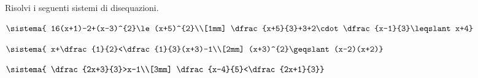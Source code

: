 \begin{esercizio}[*]
\label{ese:21.37}
Risolvi i seguenti sistemi di disequazioni.
\begin{enumeratea}
\item \(\sistema{
16(x+1)-2+(x-3)^{2}\le(x+5)^{2}\\[1mm]
\dfrac{x+5}{3}+3+2\cdot\dfrac{x-1}{3}\leqslant x+4}\)
\sol{\R}
\item \(\sistema{
x+\dfrac{1}{2}<\dfrac{1}{3}(x+3)-1\\[2mm]
(x+3)^{2}\geqslant (x-2)(x+2)}\)
\item \(\sistema{
\dfrac{2x+3}{3}>x-1\\[3mm]
\dfrac{x-4}{5}<\dfrac{2x+1}{3}}\)
\end{enumeratea}
\end{esercizio}


\subsubsection*{}

